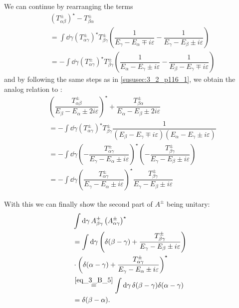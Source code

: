 We can continue by rearranging the terms
\begin{align*}
	&\left(T_{\alpha\beta}^\pm\right)^\star-T_{\beta\alpha}^\pm\\
	&=\int\dd{\gamma}\left(T_{\alpha\gamma}^\pm\right)^\star T_{\beta\gamma}^\pm
	\left(\dfrac{1}{E_\gamma-E_\alpha\mp i \varepsilon}-\dfrac{1}{E_\gamma-E_\beta\pm i \varepsilon}\right)\\
	&=-\int\dd{\gamma}\left(T_{\alpha\gamma}^\pm\right)^\star T_{\beta\gamma}^\pm
	\left(\dfrac{1}{E_\alpha-E_\gamma\pm i \varepsilon}-\dfrac{1}{E_\beta-E_\gamma\mp i \varepsilon}\right)
\end{align*}
and by following the same steps as in \ref{sususec:3_2_p116_1}, we obtain the analog relation to :
\begin{align}
	&\left(\dfrac{T_{\alpha\beta}^\pm}{E_\beta-E_\alpha\pm 2i\varepsilon}\right)^\star
	+\dfrac{T_{\beta\alpha}^\pm}{E_\alpha-E_\beta\pm 2i\varepsilon}\nonumber\\
	&=-\int\dd{\gamma}\left(T_{\alpha\gamma}^\pm\right)^\star T_{\beta\gamma}^\pm \dfrac{1}{(E_\beta-E_\gamma\mp i \varepsilon)(E_\alpha-E_\gamma\pm i \varepsilon)}\nonumber\\
	&=-\int\dd{\gamma}\left(-\dfrac{T_{\alpha\gamma}^\pm}{E_\gamma-E_\alpha\pm i \varepsilon}\right)^\star
	\left(-\dfrac{T_{\beta\gamma}^\pm}{E_\gamma-E_\beta\pm i \varepsilon}\right)\nonumber\\
	&=-\int\dd{\gamma}\left(\dfrac{T_{\alpha\gamma}^\pm}{E_\gamma-E_\alpha\pm i \varepsilon}\right)^\star
	\dfrac{T_{\beta\gamma}^\pm}{E_\gamma-E_\beta\pm i \varepsilon}\label{eq_3_B_5}
\end{align}

With this we can finally show the second part of $A^\pm$ being unitary:
\begin{align*}
	&\int\dd{\gamma} A_{\beta\gamma}^\pm \left(A_{\alpha\gamma}^\pm\right)^\star\\
	&=\int\dd{\gamma}\left(\delta(\beta-\gamma)+\dfrac{T_{\beta\gamma}^\pm}{E_\gamma-E_\beta\pm i \varepsilon}\right)\\
	&\cdot\left(\delta(\alpha-\gamma)+\dfrac{T_{\alpha\gamma}^\pm}{E_\gamma-E_\alpha\pm i \varepsilon}\right)^\star\\
	&\overset{\ref{eq_3_B_5}}{=}\int\dd{\gamma}\delta(\beta-\gamma)\delta(\alpha-\gamma)\\
	&=\delta(\beta-\alpha).
\end{align*}





